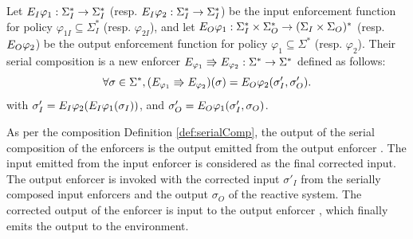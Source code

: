 \begin{definition}
	\label{def:serialComp}
	Let $E_{I}{\varphi_1}: \Sigma_I^* \rightarrow \Sigma_I^*$ (resp. $E_{I}{\varphi_2}: \Sigma_I^* \rightarrow \Sigma_I^*$) be the input enforcement function for policy $\varphi_{1I}  \subseteq \Sigma_I^*$ (resp. $\varphi_{2I}$), and 
	let 
	$E_{O}{\varphi_1}: \Sigma_I^* \times \Sigma_O^* \rightarrow (\Sigma_I \times \Sigma_O)^*$ (resp. $E_{O}{\varphi_2}$) be the output enforcement function for policy $\varphi_1  \subseteq \Sigma^*$ (resp. $\varphi_2$). 
	Their serial composition is a new enforcer $E_{{\varphi_1}} \Rrightarrow E_{{\varphi_2}}: \Sigma^* \rightarrow \Sigma^*$ defined as follows:
	\[
	\forall \sigma\in\Sigma^*,
	(E_{{\varphi_1}} \Rrightarrow E_{{\varphi_2}})(\sigma)
	= E_{O}{\varphi_2}(\sigma'_I, \sigma'_O).
	\]
	with $\sigma'_I = E_{I}{\varphi_2}(E_{I}{\varphi_1}({\sigma_I}))$, and $\sigma'_O = E_{O}{\varphi_1}(\sigma'_I, \sigma_O)$.
\end{definition}
As per the composition Definition \ref{def:serialComp}, the output of the serial composition of the enforcers is the output emitted from the output enforcer . The input emitted from the input enforcer  is considered as the final corrected input. The output enforcer  is invoked with the corrected input $\sigma'_I$ from the serially composed input enforcers and the output $\sigma_O$ of the reactive system. The corrected output of the enforcer is input to the output enforcer , which finally emits the output to the environment.   

